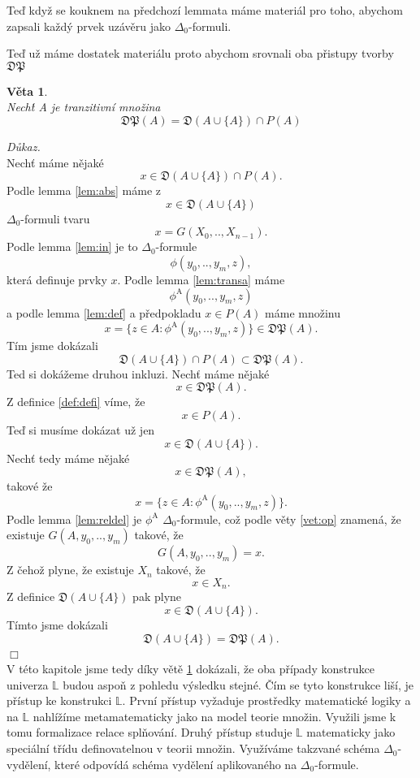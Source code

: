 \documentclass[12pt,a4paper]{article}
\newtheorem{veta}{V\v{e}ta}[section]%
\newenvironment{proof}
{\noindent \textit{D\r{u}kaz.}}
{\hspace*{\fill} $\Box$}
\begin{document}
Te\v{d} kdy\v{z} se kouknem na p\v{r}edchoz\'{i} lemmata m\'{a}me materi\'{a}l pro toho, abychom zapsali ka\v{z}d\'{y} prvek uz\'{a}v\v{e}ru jako $\Delta_0$-formuli. 

Te\v{d} u\v{z} m\'{a}me dostatek materi\'{a}lu proto abychom srovnali oba p\v{r}istupy tvorby $ \mathfrak{DP} $

\begin{veta}
~\\
\label{vet:rovno}
Nech\'{t} A je tranzitivn\'{i} mno\v{z}ina
\[ \mathfrak{DP}(A)= \mathfrak{D}(A \cup \{A\} ) \cap P(A) \]
\end{veta}
\begin{proof}~\\
Nech\v{t} m\'{a}me n\v{e}jak\'{e} 
\[ x \in \mathfrak{D}(A \cup \{A\} ) \cap P(A) .\]  
Podle lemma \ref{lem:abs} m\'{a}me z \[ x \in \mathfrak{D}(A \cup \{A\} ) \]  $\Delta_0$-formuli tvaru 
\[ x=G(X_0,..,X_{n-1}) .\] 
Podle lemma \ref{lem:in} je to $\Delta_0$-formule  \[ \phi (y_0,..,y_{m},z) , \] kter\'{a} definuje prvky $ x $. Podle lemma \ref{lem:transa} m\'{a}me  \[ \phi^\mathrm{A} (y_0,..,y_{m},z) \]  a podle lemma \ref{lem:def} a p\v{r}edpokladu $ x \in P(A) $ m\'{a}me mno\v{z}inu \[ x=\{z \in A: \phi^\mathrm{A} (y_0,..,y_{m},z)\} \in \mathfrak{DP}(A) .\]
T\'{i}m jsme dok\'{a}zali \[ \mathfrak{D}(A \cup \{A\} ) \cap P(A) \subset \mathfrak{DP}(A) .\]
Ted si dok\'{a}\v{z}eme druhou inkluzi.
Nech\v{t} m\'{a}me n\v{e}jak\'{e} 
\[ x \in \mathfrak{DP}(A) .\] 
Z definice \ref{def:defi} v\'{i}me, \v{z}e 
\[  x \in P(A) .\]
Te\v{d} si mus\'{i}me dok\'{a}zat u\v{z} jen 
\[  x \in \mathfrak{D}(A \cup \{A\} ) .\]
Nech\v{t} tedy m\'{a}me n\v{e}jak\'{e} 
\[ x \in \mathfrak{DP}(A), \] 
takov\'{e} \v{z}e 
\[ x=\{z \in A:\phi^\mathrm{A} (y_0,..,y_{m},z)\} .\]
Podle lemma \ref{lem:reldel} je $\phi^\mathrm{A}$ $\Delta_0$-formule, co\v{z} podle v\v{e}ty \ref{vet:op} znamen\'{a}, \v{z}e existuje $ G(A,{y_0},..,{y_m}) $ takov\'{e}, \v{z}e
\[ G(A,{y_0},..,{y_m})=x .\]
Z \v{c}eho\v{z} plyne, \v{z}e existuje $ X_n $ takov\'{e}, \v{z}e
\[ x \in X_n .\]
Z definice $ \mathfrak{D}(A\cup \{A\}) $ pak plyne
\[ x \in \mathfrak{D}(A\cup \{A\}) .\]
T\'{i}mto jsme dok\'{a}zali 
\[ \mathfrak{D}(A\cup \{A\})= \mathfrak{DP}(A) .\]
\end{proof}~\\
V t\'{e}to kapitole jsme tedy d\'{i}ky v\v{e}t\v{e} \ref{vet:rovno} dok\'{a}zali, \v{z}e oba p\v{r}\'{i}pady konstrukce univerza $ \mathbb{L} $ budou aspo\v{n} z pohledu v\'{y}sledku stejn\'{e}. \v{C}\'{i}m se tyto konstrukce li\v{s}\'{i}, je p\v{r}\'{i}stup ke konstrukci $ \mathbb{L} $. Prvn\'{i} p\v{r}\'{i}stup vy\v{z}aduje prost\v{r}edky matematick\'{e} logiky a na $ \mathbb{L} $ nahl\'{i}\v{z}\'{i}me metamatematicky jako na model teorie mno\v{z}in. Vyu\v{z}ili jsme k tomu formalizace relace spl\v{n}ov\'{a}n\'{i}. Druh\'{y} p\v{r}\'{i}stup studuje $ \mathbb{L} $ matematicky jako speci\'{a}ln\'{i} t\v{r}\'{i}du definovatelnou v teorii mno\v{z}in. Vyu\v{z}\'{i}v\'{a}me takzvan\'{e} sch\'{e}ma $\Delta_0$-vyd\v{e}len\'{i}, kter\'{e} odpov\'{i}d\'{a} sch\'{e}ma vyd\v{e}len\'{i} aplikovan\'{e}ho na $\Delta_0$-formule.
\end{document}
